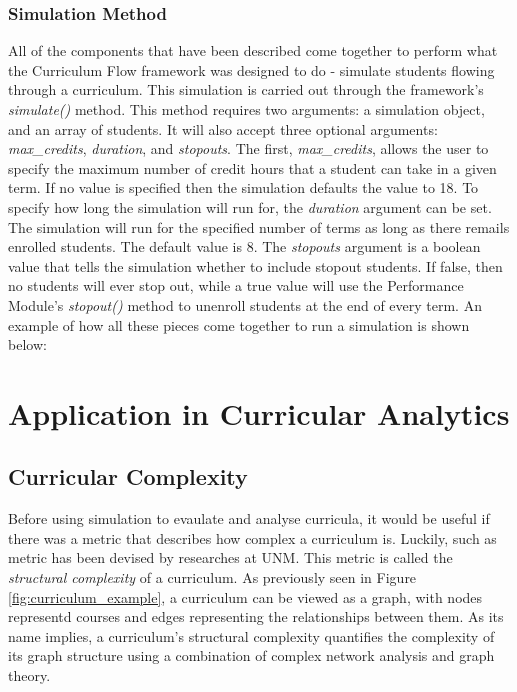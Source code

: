 \documentclass[botnum, fleqn]{unmeethesis}
\begin{document}
\subsection{Simulation Method}
All of the components that have been described come together to perform what the Curriculum Flow framework was designed to do - simulate students flowing through a curriculum. This simulation is carried out through the framework's \textit{simulate()} method. This method requires two arguments: a simulation object, and an array of students. It will also accept three optional arguments: \textit{max\_credits}, \textit{duration}, and \textit{stopouts}. The first, \textit{max\_credits}, allows the user to specify the maximum number of credit hours that a student can take in a given term. If no value is specified then the simulation defaults the value to 18. To specify how long the simulation will run for, the \textit{duration} argument can be set. The simulation will run for the specified number of terms as long as there remails enrolled students. The default value is 8. The \textit{stopouts} argument is a boolean value that tells the simulation whether to include stopout students. If false, then no students will ever stop out, while a true value will use the Performance Module's \textit{stopout()} method to unenroll students at the end of every term. An example of how all these pieces come together to run a simulation is shown below:



\chapter{Application in Curricular Analytics}

\section{Curricular Complexity}

Before using simulation to evaulate and analyse curricula, it would be useful if there was a metric that describes how complex a curriculum is. Luckily, such as metric has been devised by researches at UNM. This metric is called the \textit{structural complexity} of a curriculum. As previously seen in Figure \ref{fig:curriculum_example}, a curriculum can be viewed as a graph, with nodes representd courses and edges representing the relationships between them. As its name implies, a curriculum's structural complexity quantifies the complexity of its graph structure using a combination of complex network analysis and graph theory. 
\end{document}
